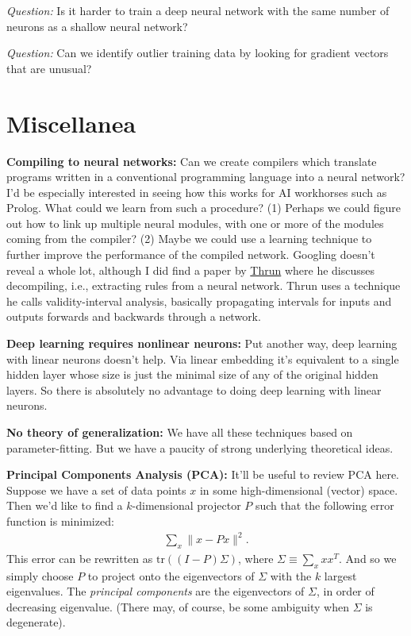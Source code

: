 \documentclass[12pt]{report}
\newcommand{\link}[2]{\href{#1}{#2}}
\begin{document}
\emph{Question:} Is it harder to train a deep neural network with the
same number of neurons as a shallow neural network?

\emph{Question:} Can we identify outlier training data by looking for
gradient vectors that are unusual?

\chapter{Miscellanea}

\textbf{Compiling to neural networks:} Can we create compilers which
translate programs written in a conventional programming language into
a neural network?  I'd be especially interested in seeing how this
works for AI workhorses such as Prolog.  What could we learn from such
a procedure?  (1) Perhaps we could figure out how to link up multiple
neural modules, with one or more of the modules coming from the
compiler? (2) Maybe we could use a learning technique to further
improve the performance of the compiled network.  Googling doesn't
reveal a whole lot, although I did find a paper by
\link{http://scholar.google.ca/scholar?cluster=10518384657895134615\&hl=en\&as\_sdt=0,5}{Thrun}
where he discusses decompiling, i.e., extracting rules from a neural
network.  Thrun uses a technique he calls validity-interval analysis,
basically propagating intervals for inputs and outputs forwards and
backwards through a network.

\textbf{Deep learning requires nonlinear neurons:} Put another way,
deep learning with linear neurons doesn't help.  Via linear embedding
it's equivalent to a single hidden layer whose size is just the
minimal size of any of the original hidden layers.  So there is
absolutely no advantage to doing deep learning with linear neurons.

\textbf{No theory of generalization:} We have all these techniques
based on parameter-fitting.  But we have a paucity of strong
underlying theoretical ideas.

\textbf{Principal Components Analysis (PCA):} It'll be useful to
review PCA here.  Suppose we have a set of data points $x$ in some
high-dimensional (vector) space.  Then we'd like to find a
$k$-dimensional projector $P$ such that the following error function
is minimized:
\begin{eqnarray}
\sum_x \| x-Px \|^2.
\end{eqnarray}
This error can be rewritten as $\mbox{tr}((I-P)\Sigma)$, where $\Sigma
\equiv \sum_x x x^T$.  And so we simply choose $P$ to project onto the
eigenvectors of $\Sigma$ with the $k$ largest eigenvalues.  The
\emph{principal components} are the eigenvectors of $\Sigma$, in order
of decreasing eigenvalue.  (There may, of course, be some ambiguity
when $\Sigma$ is degenerate).
\end{document}

